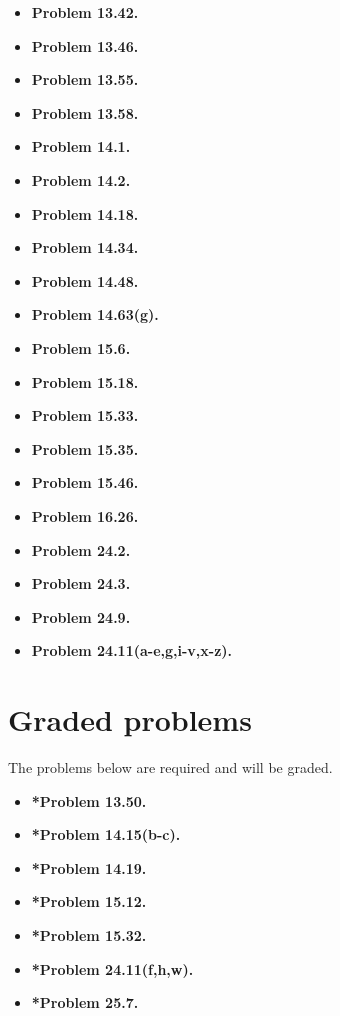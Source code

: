 \documentclass[11pt]{article}
\begin{document}
\begin{multicols}{2}
\begin{itemize}

\item \textbf{Problem 13.42.}
\item \textbf{Problem 13.46.}
\item \textbf{Problem 13.55.}
\item \textbf{Problem 13.58.}
\item \textbf{Problem 14.1.}
\item \textbf{Problem 14.2.}
\item \textbf{Problem 14.18.}
\item \textbf{Problem 14.34.}
\item \textbf{Problem 14.48.}
\item \textbf{Problem 14.63(g).}
\item \textbf{Problem 15.6.}
\item \textbf{Problem 15.18.}
\item \textbf{Problem 15.33.}
\item \textbf{Problem 15.35.}
\item \textbf{Problem 15.46.}
\item \textbf{Problem 16.26.}
\item \textbf{Problem 24.2.}
\item \textbf{Problem 24.3.}
\item \textbf{Problem 24.9.}
\item \textbf{Problem 24.11(a-e,g,i-v,x-z).}

\end{itemize}
\end{multicols}

\section*{Graded problems}
The problems below are required and will be graded.
\begin{itemize}

\item \textbf{*Problem 13.50.}
\item \textbf{*Problem 14.15(b-c).}  %
\item \textbf{*Problem 14.19.}
\item \textbf{*Problem 15.12.}
\item \textbf{*Problem 15.32.}
\item \textbf{*Problem 24.11(f,h,w).}
\item \textbf{*Problem 25.7.}

\end{itemize}
\end{document}
